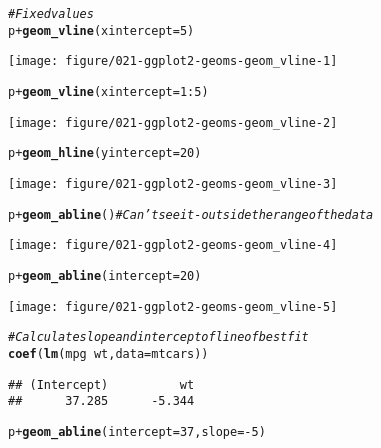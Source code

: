 \documentclass[a4paper,titlepage]{tufte-handout}\usepackage[]{graphicx}\usepackage[]{color}
\makeatletter
\def\maxwidth{ %
  \ifdim\Gin@nat@width>\linewidth
    \linewidth
  \else
    \Gin@nat@width
  \fi
}
\newcommand{\hlnum}[1]{\textcolor[rgb]{0.686,0.059,0.569}{#1}}%
\newcommand{\hlcom}[1]{\textcolor[rgb]{0.678,0.584,0.686}{\textit{#1}}}%
\newcommand{\hlopt}[1]{\textcolor[rgb]{0,0,0}{#1}}%
\newcommand{\hlstd}[1]{\textcolor[rgb]{0.345,0.345,0.345}{#1}}%
\newcommand{\hlkwc}[1]{\textcolor[rgb]{0.333,0.667,0.333}{#1}}%
\newcommand{\hlkwd}[1]{\textcolor[rgb]{0.737,0.353,0.396}{\textbf{#1}}}%
\newenvironment{kframe}{%
 \def\at@end@of@kframe{}%
 \ifinner\ifhmode%
  \def\at@end@of@kframe{\end{minipage}}%
  \begin{minipage}{\columnwidth}%
 \fi\fi%
 \def\FrameCommand##1{\hskip\@totalleftmargin \hskip-\fboxsep
 \colorbox{shadecolor}{##1}\hskip-\fboxsep
     \hskip-\linewidth \hskip-\@totalleftmargin \hskip\columnwidth}%
 \MakeFramed {\advance\hsize-\width
   \@totalleftmargin\z@ \linewidth\hsize
   \@setminipage}}%
 {\par\unskip\endMakeFramed%
 \at@end@of@kframe}
\newenvironment{knitrout}{}{} %
\makeatother
\begin{document}
\begin{knitrout}
\begin{kframe}
\begin{alltt}
\hlcom{# Fixed values}
\hlstd{p} \hlopt{+} \hlkwd{geom_vline}\hlstd{(}\hlkwc{xintercept} \hlstd{=} \hlnum{5}\hlstd{)}
\end{alltt}
\end{kframe}
\texttt{[image: figure/021-ggplot2-geoms-geom\_vline-1]} 
\begin{kframe}\begin{alltt}
\hlstd{p} \hlopt{+} \hlkwd{geom_vline}\hlstd{(}\hlkwc{xintercept} \hlstd{=} \hlnum{1}\hlopt{:}\hlnum{5}\hlstd{)}
\end{alltt}
\end{kframe}
\texttt{[image: figure/021-ggplot2-geoms-geom\_vline-2]} 
\begin{kframe}\begin{alltt}
\hlstd{p} \hlopt{+} \hlkwd{geom_hline}\hlstd{(}\hlkwc{yintercept} \hlstd{=} \hlnum{20}\hlstd{)}
\end{alltt}
\end{kframe}
\texttt{[image: figure/021-ggplot2-geoms-geom\_vline-3]} 
\begin{kframe}\begin{alltt}
\hlstd{p} \hlopt{+} \hlkwd{geom_abline}\hlstd{()} \hlcom{# Can't see it - outside the range of the data}
\end{alltt}
\end{kframe}
\texttt{[image: figure/021-ggplot2-geoms-geom\_vline-4]} 
\begin{kframe}\begin{alltt}
\hlstd{p} \hlopt{+} \hlkwd{geom_abline}\hlstd{(}\hlkwc{intercept} \hlstd{=} \hlnum{20}\hlstd{)}
\end{alltt}
\end{kframe}
\texttt{[image: figure/021-ggplot2-geoms-geom\_vline-5]} 
\begin{kframe}\begin{alltt}
\hlcom{# Calculate slope and intercept of line of best fit}
\hlkwd{coef}\hlstd{(}\hlkwd{lm}\hlstd{(mpg} \hlopt{~} \hlstd{wt,} \hlkwc{data} \hlstd{= mtcars))}
\end{alltt}
\begin{verbatim}
## (Intercept)          wt 
##      37.285      -5.344
\end{verbatim}
\begin{alltt}
\hlstd{p} \hlopt{+} \hlkwd{geom_abline}\hlstd{(}\hlkwc{intercept} \hlstd{=} \hlnum{37}\hlstd{,} \hlkwc{slope} \hlstd{=} \hlopt{-}\hlnum{5}\hlstd{)}
\end{alltt}
\end{kframe}

\end{knitrout}
\end{document}
